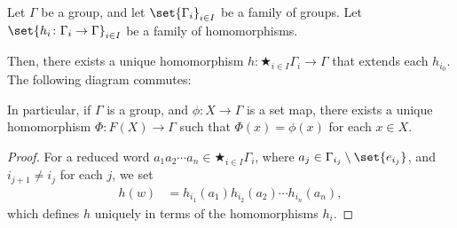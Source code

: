 \begin{theorem}
  Let $\Gamma$ be a group, and let $\set{\Gamma_{i}}_{i\in I}$ be a family of groups. Let $\set{h_i\colon \Gamma_i\rightarrow \Gamma}_{i\in I}$ be a family of homomorphisms.\newline

  Then, there exists a unique homomorphism $h\colon \bigstar_{i\in I}\Gamma_i \rightarrow \Gamma$ that extends each $h_{i_{0}}$. The following diagram commutes:
  \begin{center}
  \end{center}
  In particular, if $\Gamma$ is a group, and $\phi\colon X\rightarrow \Gamma$ is a set map, there exists a unique homomorphism $\Phi\colon F(X)\rightarrow \Gamma$ such that $\Phi(x) = \phi(x)$ for each $x\in X$.
\end{theorem}
\begin{proof}
  For a reduced word $a_1a_2\cdots a_n\in \bigstar_{i\in I}\Gamma_i$, where $a_j\in \Gamma_{i_j}\setminus \set{e_{i_j}}$, and $i_{j+1} \neq i_j$ for each $j$, we set
  \begin{align*}
    h\left(w\right) &= h_{i_1}\left(a_1\right)h_{i_2}\left(a_2\right)\cdots h_{i_n}\left(a_n\right),
  \end{align*}
  which defines $h$ uniquely in terms of the homomorphisms $h_{i}$.
\end{proof}
